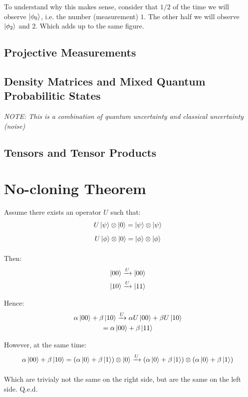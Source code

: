 \documentclass{article}
\newcommand{\tens}[1]{%
  \mathbin{\mathop{\otimes}\limits_{#1}}%
}
\begin{document}
To understand why this makes sense, consider that $1/2$ of the time we will observe $\ket{\phi_0}$, i.e. the number (measurement) $1$. The other half we will observe $\ket{\phi_2}$ and $2$. Which adds up to the same figure.

\subsection{Projective Measurements}
\subsection{Density Matrices and Mixed Quantum Probabilitic States}
\textit{NOTE: This is a combination of quantum uncertainty and classical uncertainty (noise)}
\subsection{Tensors and Tensor Products}

\section{No-cloning Theorem}
Assume there exists an operator $U$ such that:
\begin{gather*}
    U \ket{\psi} \tens{} \ket{0} = \ket{\psi} \tens{} \ket{\psi} \\
    U \ket{\phi} \tens{} \ket{0} = \ket{\phi} \tens{} \ket{\phi}
\end{gather*}

Then:
\begin{gather*}
    \ket{00} \xrightarrow{U} \ket{00} \\
    \ket{10} \xrightarrow{U} \ket{11}
\end{gather*}

Hence:
\begin{gather*}
    \alpha \ket{00} + \beta \ket{10} \xrightarrow{U} 
        \alpha U \ket{00} + \beta U \ket{10} \\
        = \alpha \ket{00} + \beta \ket{11}
\end{gather*}

However, at the same time:
\begin{gather*}
    \alpha \ket{00} + \beta \ket{10} = (\alpha \ket{0} + \beta \ket{1}) \tens{} \ket{0} \xrightarrow{U}
        (\alpha \ket{0} + \beta \ket{1}) \tens{} (\alpha \ket{0} + \beta \ket{1})
\end{gather*}

Which are trivialy not the same on the right side, but are the same on the left side. Q.e.d.
\end{document}
